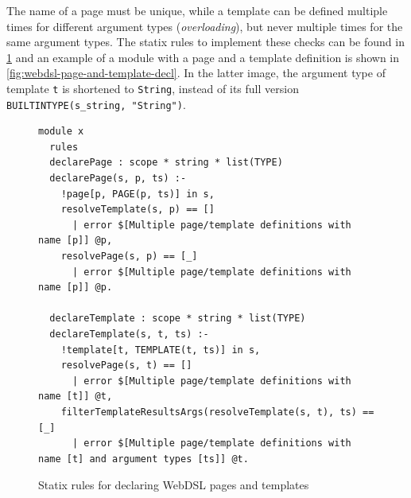       The name of a page must be unique, while a template can be defined multiple times for different argument types (\textit{overloading}), but never multiple times for the same argument types. The statix rules to implement these checks can be found in \cref{fig:webdsl-page-and-template-definition} and an example of a module with a page and a template definition is shown in \cref{fig:webdsl-page-and-template-decl}. In the latter image, the argument type of template \texttt{t} is shortened to \texttt{String}, instead of its full version \texttt{BUILTINTYPE(s\_string, "String")}.

      \begin{figure}
        \begin{verbatim}
module x
  rules
  declarePage : scope * string * list(TYPE)
  declarePage(s, p, ts) :-
    !page[p, PAGE(p, ts)] in s,
    resolveTemplate(s, p) == []
      | error $[Multiple page/template definitions with name [p]] @p,
    resolvePage(s, p) == [_]
      | error $[Multiple page/template definitions with name [p]] @p.

  declareTemplate : scope * string * list(TYPE)
  declareTemplate(s, t, ts) :-
    !template[t, TEMPLATE(t, ts)] in s,
    resolvePage(s, t) == []
      | error $[Multiple page/template definitions with name [t]] @t,
    filterTemplateResultsArgs(resolveTemplate(s, t), ts) == [_]
      | error $[Multiple page/template definitions with name [t] and argument types [ts]] @t.
        \end{verbatim}
        \caption{\label{fig:webdsl-page-and-template-definition}Statix rules for declaring WebDSL pages and templates}
      \end{figure}
      
